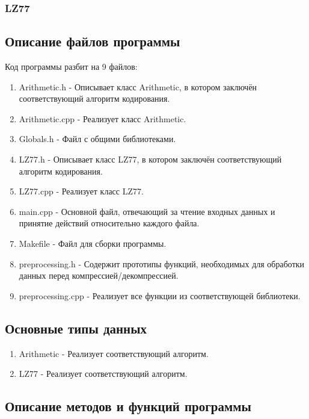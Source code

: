 \documentclass[12pt]{article}
\begin{document}
\subsubsection*{LZ77}%



\subsection*{Описание файлов программы}

Код программы разбит на 9 файлов:

\begin{enumerate}
	\item Arithmetic.h - Описывает класс Arithmetic, в котором заключён соответствующий алгоритм кодирования. 
	\item Arithmetic.cpp - Реализует класс Arithmetic.
	\item Globals.h - Файл с общими библиотеками.
	\item LZ77.h - Описывает класс LZ77, в котором заключён соответствующий алгоритм кодирования.
	\item LZ77.cpp - Реализует класс LZ77.
	\item main.cpp - Основной файл, отвечающий за чтение входных данных и принятие действий относительно каждого файла.
	\item Makefile - Файл для сборки программы.
	\item preprocessing.h - Содержит прототипы функций, необходимых для обработки данных перед компрессией/декомпрессией.
	\item preprocessing.cpp - Реализует все функции из соответствующей библиотеки.
\end{enumerate}

\subsection*{Основные типы данных}

\begin{enumerate}
	\item Arithmetic - Реализует соответствующий алгоритм.
	\item LZ77 - Реализует соответствующий алгоритм.
\end{enumerate}

\subsection*{Описание методов и функций программы}
 
\end{document}
